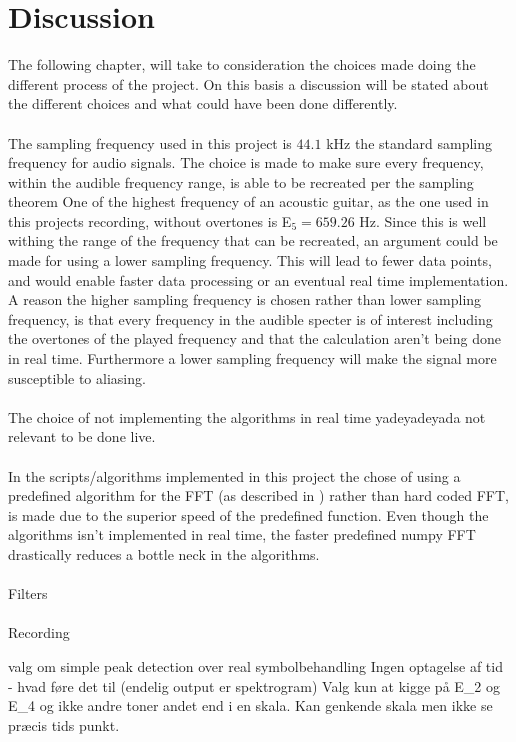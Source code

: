 \chapter{Discussion}
The following chapter, will take to consideration the choices made doing the different process of the project.
On this basis a discussion will be stated about the different choices and what could have been done differently.
\\\\
The sampling frequency used in this project is $44.1$ kHz the standard sampling frequency for audio signals.
The choice is made to make sure every frequency, within the audible frequency range, is able to be recreated per the sampling theorem 
One of the highest frequency of an acoustic guitar, as the one used in this projects recording, without overtones is E$_5 = 659.26$ Hz.
Since this is well withing the range of the frequency that can be recreated, an argument could be made for using a lower sampling frequency.
This will lead to fewer data points, and would enable faster data processing or an eventual real time implementation. 
A reason the higher sampling frequency is chosen rather than lower sampling frequency, is that every frequency in the audible specter is of interest including the overtones of the played frequency and that the calculation aren't being done in real time.
Furthermore a lower sampling frequency will make the signal more susceptible to aliasing. %
\\\\

The choice of not implementing the algorithms in real time yadeyadeyada not relevant to be done live. 
\\\\
In the scripts/algorithms implemented in this project the chose of using  a predefined algorithm for the FFT (as described in ) rather than hard coded FFT, is made due to the superior speed of the predefined function. 
Even though the algorithms isn't implemented in real time, the faster predefined numpy FFT drastically reduces a bottle neck in the algorithms.
\\\\

Filters
\\\\
Recording
 
valg om simple peak detection over real symbolbehandling
Ingen optagelse af tid - hvad føre det til
(endelig output er spektrogram)
Valg kun at kigge på E_2 og E_4 og ikke andre toner andet end i en skala.
Kan genkende skala men ikke se præcis tids punkt.

